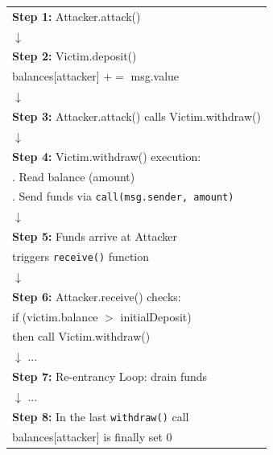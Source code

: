 \documentclass[12pt]{article}
\begin{document}
\begin{figure}[H]
\centering
\begin{minipage}{0.45\textwidth}
  \centering
  {\footnotesize
  \begin{tabular}{l}
  \textbf{Step 1:} Attacker.attack() \\
  $\downarrow$ \\
  \textbf{Step 2:} Victim.deposit() \\
  \quad balances[attacker] $\mathrel{+}= $ msg.value \\
  $\downarrow$ \\
  \textbf{Step 3:} Attacker.attack() calls Victim.withdraw() \\
  $\downarrow$ \\
  \textbf{Step 4:} Victim.withdraw() execution: \\
  \quad 1. Read balance (amount) \\
  \quad 2. Send funds via \texttt{call(msg.sender, amount)} \\
  $\downarrow$ \\
  \textbf{Step 5:} Funds arrive at Attacker \\
  \quad triggers \texttt{receive()} function \\
  $\downarrow$ \\
  \textbf{Step 6:} Attacker.receive() checks: \\
  \quad if (victim.balance $>$ initialDeposit) 
  \\ then call Victim.withdraw() \\
  $\downarrow$ ... \\
  \textbf{Step 7:} Re-entrancy Loop: drain funds \\
  $\downarrow$ ... \\
  \textbf{Step 8:} In the last \texttt{withdraw()} call \\
  balances[attacker] is finally set 0 \\
  \end{tabular}
  }
\end{minipage}\hfill
\begin{minipage}{0.45\textwidth}
  \centering

\end{minipage}
\end{figure}
\end{document}

